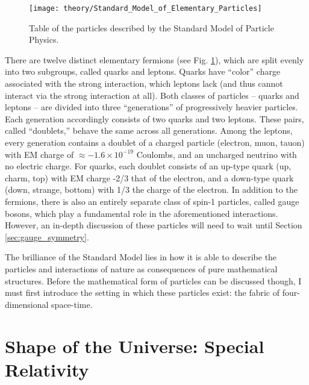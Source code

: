     \begin{figure}[h!]
        \texttt{[image: theory/Standard\_Model\_of\_Elementary\_Particles]}
        \caption{
            Table of the particles described by the Standard Model of Particle Physics\cite{wikimedia_sm}.
        }
        \label{fig:sm_particles}
    \end{figure}

    There are twelve distinct elementary fermions (see Fig. \ref{fig:sm_particles}),
        which are split evenly into two subgroups, called quarks and leptons.
    Quarks have ``color'' charge associated with the strong interaction,
        which leptons lack (and thus cannot interact via the strong interaction at all).
    Both classes of particles -- quarks and leptons -- are divided into three ``generations'' of progressively heavier particles.
    Each generation accordingly consists of two quarks and two leptons.
    These pairs, called ``doublets,'' behave the same across all generations.
    Among the leptons, every generation contains a doublet of a charged particle (electron, muon, tauon)
        with EM charge of $\approx −1.6 \times 10^{-19}$ Coulombs,
        and an uncharged neutrino with no electric charge.
    For quarks, each doublet consists of an up-type quark (up, charm, top) with EM charge -2/3 that of the electron,
        and a down-type quark (down, strange, bottom) with 1/3 the charge of the electron.
    In addition to the fermions, there is also an entirely separate class of spin-1 particles, called gauge bosons,
        which play a fundamental role in the aforementioned interactions.
    However, an in-depth discussion of these particles will need to wait until Section \ref{sec:gauge_symmetry}.

    The brilliance of the Standard Model lies in how it is able to describe the 
        particles and interactions of nature as consequences of pure mathematical structures.
    Before the mathematical form of particles can be discussed though,
        I must first introduce the setting in which these particles exist:
        the fabric of four-dimensional space-time.


\FloatBarrier
\section{Shape of the Universe: Special Relativity}

